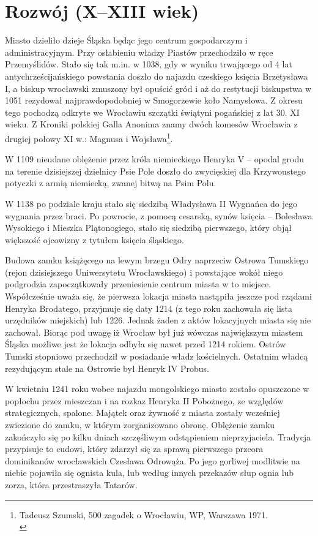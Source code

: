 \documentclass{article}
\begin{document}
\section{Rozwój (X–XIII wiek)}
Miasto dzieliło dzieje Śląska będąc jego centrum gospodarczym i administracyjnym. Przy osłabieniu władzy Piastów przechodziło w ręce Przemyślidów. Stało się tak m.in. w 1038, gdy w wyniku trwającego od 4 lat antychrześcijańskiego powstania doszło do najazdu czeskiego księcia Brzetysława I, a biskup wrocławski zmuszony był opuścić gród i aż do restytucji biskupstwa w 1051 rezydował najprawdopodobniej w Smogorzewie koło Namysłowa. Z okresu tego pochodzą odkryte we Wrocławiu szczątki świątyni pogańskiej z lat 30. XI wieku. Z Kroniki polskiej Galla Anonima znamy dwóch komesów Wrocławia z drugiej połowy XI w.: Magnusa i Wojsława\footnote{Tadeusz Szumski, 500 zagadek o Wrocławiu, WP, Warszawa 1971.\\}.

W 1109 nieudane oblężenie przez króla niemieckiego Henryka V – opodal grodu na terenie dzisiejszej dzielnicy Psie Pole doszło do zwycięskiej dla Krzywoustego potyczki z armią niemiecką, zwanej bitwą na Psim Polu.

W 1138 po podziale kraju stało się siedzibą Władysława II Wygnańca do jego wygnania przez braci. Po powrocie, z pomocą cesarską, synów księcia – Bolesława Wysokiego i Mieszka Plątonogiego, stało się siedzibą pierwszego, który objął większość ojcowizny z tytułem księcia śląskiego.

Budowa zamku książęcego na lewym brzegu Odry naprzeciw Ostrowa Tumskiego (rejon dzisiejszego Uniwersytetu Wrocławskiego) i powstające wokół niego podgrodzia zapoczątkowały przeniesienie centrum miasta w to miejsce. Współcześnie uważa się, że pierwsza lokacja miasta nastąpiła jeszcze pod rządami Henryka Brodatego, przyjmuje się daty 1214 (z tego roku zachowała się lista urzędników miejskich) lub 1226. Jednak żaden z aktów lokacyjnych miasta się nie zachował. Biorąc pod uwagę iż Wrocław był już wówczas największym miastem Śląska możliwe jest że lokacja odbyła się nawet przed 1214 rokiem. Ostrów Tumski stopniowo przechodził w posiadanie władz kościelnych. Ostatnim władcą rezydującym stale na Ostrowie był Henryk IV Probus.

W kwietniu 1241 roku wobec najazdu mongolskiego miasto zostało opuszczone w popłochu przez mieszczan i na rozkaz Henryka II Pobożnego, ze względów strategicznych, spalone. Majątek oraz żywność z miasta zostały wcześniej zwiezione do zamku, w którym zorganizowano obronę. Oblężenie zamku zakończyło się po kilku dniach szczęśliwym odstąpieniem nieprzyjaciela. Tradycja przypisuje to cudowi, który zdarzył się za sprawą pierwszego przeora dominikanów wrocławskich Czesława Odrowąża. Po jego gorliwej modlitwie na niebie pojawiła się ognista kula, lub według innych przekazów słup ognia lub zorza, która przestraszyła Tatarów.
\end{document}
